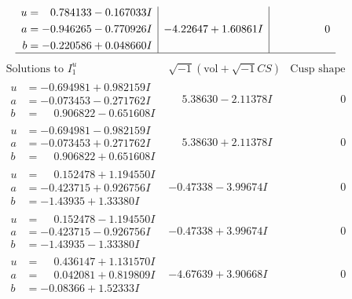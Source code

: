 \documentclass[1p]{elsarticle_modified}
\theoremstyle{definition}
\newcommand{\I}{\sqrt{-1}}
\begin{document}
$$\begin{array}{c|c|c}
\begin{aligned}
u &= \phantom{-}0.784133 - 0.167033 I \\
a &= -0.946265 - 0.770926 I \\
b &= -0.220586 + 0.048660 I\end{aligned}
 & -4.22647 + 1.60861 I & \phantom{-0.000000 } 0\\
 \hline 
 \end{array}$$\newpage$$\begin{array}{c|c|c}  
\text{Solutions to }I^u_{1}& \I (\text{vol} + \sqrt{-1}CS) & \text{Cusp shape}\\
 \hline 
\begin{aligned}
u &= -0.694981 + 0.982159 I \\
a &= -0.073453 - 0.271762 I \\
b &= \phantom{-}0.906822 - 0.651608 I\end{aligned}
 & \phantom{-}5.38630 - 2.11378 I & \phantom{-0.000000 } 0 \\ \hline\begin{aligned}
u &= -0.694981 - 0.982159 I \\
a &= -0.073453 + 0.271762 I \\
b &= \phantom{-}0.906822 + 0.651608 I\end{aligned}
 & \phantom{-}5.38630 + 2.11378 I & \phantom{-0.000000 } 0 \\ \hline\begin{aligned}
u &= \phantom{-}0.152478 + 1.194550 I \\
a &= -0.423715 + 0.926756 I \\
b &= -1.43935 + 1.33380 I\end{aligned}
 & -0.47338 - 3.99674 I & \phantom{-0.000000 } 0 \\ \hline\begin{aligned}
u &= \phantom{-}0.152478 - 1.194550 I \\
a &= -0.423715 - 0.926756 I \\
b &= -1.43935 - 1.33380 I\end{aligned}
 & -0.47338 + 3.99674 I & \phantom{-0.000000 } 0 \\ \hline\begin{aligned}
u &= \phantom{-}0.436147 + 1.131570 I \\
a &= \phantom{-}0.042081 + 0.819809 I \\
b &= -0.08366 + 1.52333 I\end{aligned}
 & -4.67639 + 3.90668 I & \phantom{-0.000000 } 0 \\ \hline\begin{aligned}

\end{aligned}
\end{array}$$
\end{document}
